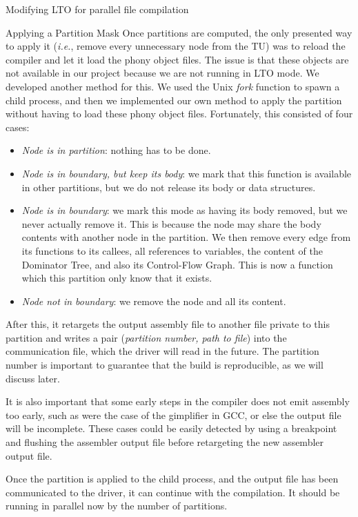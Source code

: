 \begin{section}{Modifying LTO for parallel file compilation}
\begin{subsection}{Applying a Partition Mask}
Once partitions are computed, the only presented way to apply it
(\textit{i.e.}, remove every unnecessary node from the TU) was to reload the
compiler and let it load the phony object files. The issue is that these
objects are not available in our project because we are not running in LTO
mode. We developed another method for this.
We used the Unix \textit{fork} function to spawn a child process, and then
we implemented our own method to apply the partition without having to load
these phony object files. Fortunately, this consisted
of four cases:
\begin{itemize}
	\item \textit{Node is in partition}: nothing has to be done.
	\item \textit{Node is in boundary, but keep its body}: we mark that this function
	is available in other partitions, but we do not release its body or
	data structures.
	\item \textit{Node is in boundary}: we mark this mode as having its body removed,
	but we never actually remove it. This is because the node may share the
	body contents with another node in the partition. We then remove
	every edge from its functions to its callees, all references to variables,
	the content of the Dominator Tree, and also its Control-Flow Graph. This
	is now a function which this partition only know that it exists.
	\item \textit{Node not in boundary}: we remove the node and all its content.
\end{itemize}

After this, it retargets the output assembly file to another file private to
this partition and writes a pair (\textit{partition number, path to file}) into the
communication file, which the driver will read in the future. The partition
number is important to guarantee that the build is reproducible, as we will
discuss later.

It is also important that some early steps in the compiler does not emit
assembly too early, such as were the case of the gimplifier in GCC, or else the
output file will be incomplete. These cases could be easily detected by using
a breakpoint and flushing the assembler output file before retargeting the new
assembler output file.

Once the partition is applied to the child process, and the output file has
been communicated to the driver, it can continue with the compilation. It
should be running in parallel now by the number of partitions.


\end{subsection}
\end{section}
